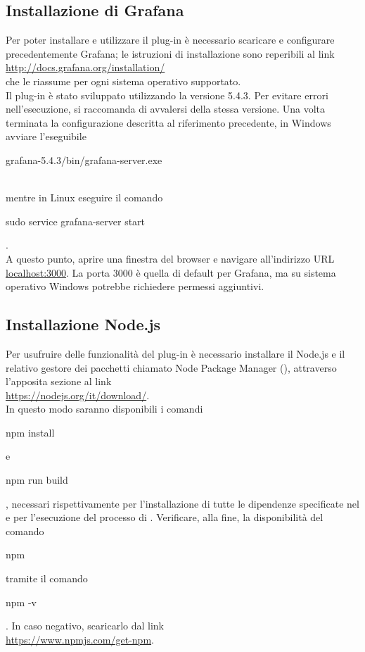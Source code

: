 \subsection{Installazione di Grafana}
Per poter installare e utilizzare il plug-in è necessario scaricare e configurare precedentemente Grafana; le istruzioni di installazione sono reperibili al link\\[0.2cm]
\hspace*{10mm}\url{http://docs.grafana.org/installation/} \\[0.2cm]
che le riassume per ogni sistema operativo supportato.\\
Il plug-in è stato sviluppato utilizzando la versione 5.4.3. Per evitare errori nell'esecuzione, si raccomanda di avvalersi della stessa versione.
Una volta terminata la configurazione descritta al riferimento precedente, in Windows avviare l'eseguibile\\[0.2cm]
\hspace*{10mm}\begin{ttfamily}grafana-5.4.3/bin/grafana-server.exe\end{ttfamily}\\[0.2cm] mentre in Linux eseguire il comando\\[0.2cm]
\hspace*{10mm}\begin{ttfamily}sudo service grafana-server start\end{ttfamily}.\\[0.2cm]
A questo punto, aprire una finestra del browser e navigare all'indirizzo URL \url{localhost:3000}. La porta 3000 è quella di default per Grafana, ma su sistema operativo Windows potrebbe richiedere permessi aggiuntivi.
\subsection{Installazione Node.js}
Per usufruire delle funzionalità del plug-in è necessario installare il  Node.js e il relativo gestore dei pacchetti chiamato Node Package Manager (), attraverso l'apposita sezione al link\\[0.2cm]
\hspace*{10mm}\url{https://nodejs.org/it/download/}.\\[0.2cm] In questo modo saranno disponibili i comandi \begin{ttfamily}npm install\end{ttfamily} e \begin{ttfamily}npm run build\end{ttfamily}, necessari rispettivamente per l'installazione di tutte le dipendenze specificate nel  e per l'esecuzione del processo di .
Verificare, alla fine, la disponibilità del comando \begin{ttfamily}npm\end{ttfamily} tramite il comando \begin{ttfamily}npm -v\end{ttfamily}. In caso negativo, scaricarlo dal link \\[0.2cm]
\hspace*{10mm}\url{https://www.npmjs.com/get-npm}.

